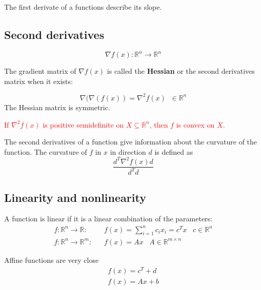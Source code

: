 The first derivate of a functions describe its slope.



\subsection{Second derivatives}
\begin{equation}
    \nabla f(x): \mathbb{R}^n\rightarrow\mathbb{R}^n
\end{equation}

The gradient matrix of $\nabla f(x)$ is called the \textbf{Hessian} or the second derivatives matrix when it exists:

\begin{equation}
    \nabla(\nabla(f(x))=\nabla^2f(x) \;\; \in \mathbb{R}^n
\end{equation}
The Hessian matrix is symmetric.

\textcolor{red}{If $\nabla^2 f(x)$ is positive semidefinite on $X\subseteq\mathbb{R}^n$, then $f$ is convex on $X$.}


The second derivatives of a function give information about the curvature of the function. The curvature of $f$ in $x$ in direction $d$ is defined as
\begin{equation}
    \frac{d^T\nabla^2 f(x)d}{d^Td}
\end{equation}

\subsection{Linearity and nonlinearity}

A function is linear if it is a linear combination of the parameters:
\begin{equation}
\begin{split}
    f: \mathbb{R}^n \rightarrow \mathbb{R}:&\;\;\; f(x) = \sum_{i=1}^n c_i x_i = c^T x \;\;\; c\in\mathbb{R}^n \\
    f: \mathbb{R}^n \rightarrow \mathbb{R}^m:&\;\;\; f(x) = Ax \;\;\; A\in\mathbb{R}^{m\times n}
\end{split}
\end{equation}

Affine functions are very close
\begin{equation}
\begin{split}
    f(x) = c^T+d \\
    f(x) = Ax+b
\end{split}
\end{equation}


